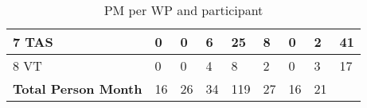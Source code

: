 \begin{table}[H]
\begin{tabular}{p{1.9cm} p{1cm} p{1cm} p{1cm} p{1cm} p{1cm} p{1cm} p{1cm} | p{2.3cm}}
	 	 7 TAS & 0 & 0 & 6 & 25 & \textbf{8} & 0 & 2 & 41\vspace{0.2cm} \\
	
	 	 \midrule
	 	 
	 	 8 VT & 0 & 0 & 4 & 8 & 2 & 0 & 3 & 17 \vspace{0.2cm} \\
	 	 
	 	 \midrule[1.5pt]
	 	 
	 	 \textbf{Total Person Month} & 16 & 26 & 34 & 119 & 27 & 16 & 21 & \vspace{0.2cm} \\
		
		\bottomrule[2pt]
		
	\end{tabular}
	\caption{PM per WP and participant}
	\label{PMWP}
\end{table}